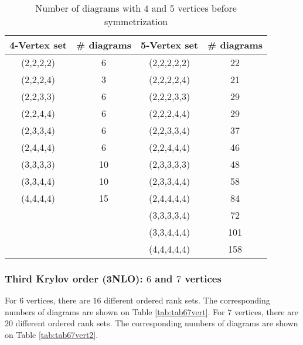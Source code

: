 \documentclass[twocolumn,secnumarabic,amssymb, nobibnotes, aps, prd]{revtex4-2}
\begin{document}
\begin{table}[]
\centering
\begin{tabular}{|c|c|c|c|}
\hline
4-Vertex set & \# diagrams & 5-Vertex set & \# diagrams \\    \hline
(2,2,2,2)  & 6 & (2,2,2,2,2)  & 22 \\
(2,2,2,4)  & 3 & (2,2,2,2,4)  & 21 \\
(2,2,3,3)  & 6 & (2,2,2,3,3)  & 29 \\
(2,2,4,4)  & 6 & (2,2,2,4,4)  & 29 \\
(2,3,3,4)  & 6 & (2,2,3,3,4)  & 37 \\
(2,4,4,4)  & 6 & (2,2,4,4,4)  & 46 \\
(3,3,3,3)  & 10 & (2,3,3,3,3)  & 48 \\
(3,3,4,4)  & 10 & (2,3,3,4,4)  & 58 \\
(4,4,4,4)  & 15 & (2,4,4,4,4)  & 84 \\ 
& & (3,3,3,3,4)  & 72 \\ 
& & (3,3,4,4,4)  & 101 \\
& & (4,4,4,4,4)  & 158 \\   \hline
\end{tabular}
\caption{Number of diagrams with $4$ and $5$ vertices before symmetrization}
\label{tab:tab45vert}
\end{table}
\subsubsection{Third Krylov order (3NLO): $6$ and $7$ vertices}
For $6$ vertices, there are $16$ different ordered rank sets.
The corresponding numbers of diagrams are shown on Table \ref{tab:tab67vert}.
For $7$ vertices, there are $20$ different ordered rank sets.
The corresponding numbers of diagrams are shown on Table \ref{tab:tab67vert2}.
\end{document}
